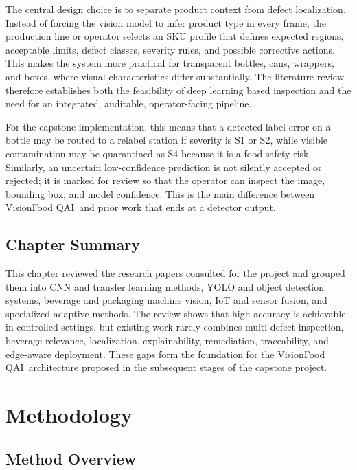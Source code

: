 \documentclass[12pt,a4paper]{report}
\newcommand{\shorttitle}{VisionFood QAI}
\begin{document}
The central design choice is to separate product context from defect localization. Instead of forcing the vision model to infer product type in every frame, the production line or operator selects an SKU profile that defines expected regions, acceptable limits, defect classes, severity rules, and possible corrective actions. This makes the system more practical for transparent bottles, cans, wrappers, and boxes, where visual characteristics differ substantially. The literature review therefore establishes both the feasibility of deep learning based inspection and the need for an integrated, auditable, operator-facing pipeline.

For the capstone implementation, this means that a detected label error on a bottle may be routed to a relabel station if severity is S1 or S2, while visible contamination may be quarantined as S4 because it is a food-safety risk. Similarly, an uncertain low-confidence prediction is not silently accepted or rejected; it is marked for review so that the operator can inspect the image, bounding box, and model confidence. This is the main difference between \shorttitle\ and prior work that ends at a detector output.

\section{Chapter Summary}
\label{sec:literature-summary}

This chapter reviewed the research papers consulted for the project and grouped them into CNN and transfer learning methods, YOLO and object detection systems, beverage and packaging machine vision, IoT and sensor fusion, and specialized adaptive methods. The review shows that high accuracy is achievable in controlled settings, but existing work rarely combines multi-defect inspection, beverage relevance, localization, explainability, remediation, traceability, and edge-aware deployment. These gaps form the foundation for the \shorttitle\ architecture proposed in the subsequent stages of the capstone project.

\chapter{Methodology}
\label{ch:methodology}

\section{Method Overview}
\label{sec:method-overview}
\end{document}
